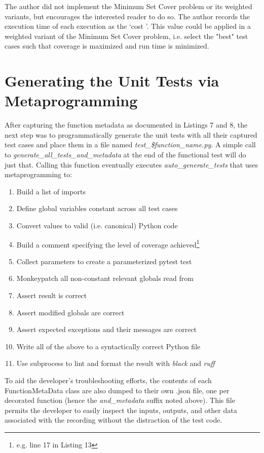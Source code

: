 The author did not implement 
the Minimum Set Cover problem or its weighted variants, but encourages 
the interested reader to do so.  The author records the execution time of each 
execution as the \lq cost \rq. This value could be applied in a weighted 
variant of the Minimum Set Cover problem, i.e. select the "best" test cases
such that coverage is maximized and run time is minimized.

\section{Generating the Unit Tests via Metaprogramming}\label{sec:generating-tests}

After capturing the function metadata as documented in Listings 7 and 8, 
the next step was to programmatically generate the unit tests with all their 
captured test cases and place them in a file named 
\textit{test\_\$function\_name.py}. 
A simple call to \textit{generate\_all\_tests\_and\_metadata} at the end of 
the functional test will do just that.
 Calling this function eventually executes 
\textit{auto\_generate\_tests} that uses metaprogramming to:
\begin{enumerate}
  \item Build a list of imports
  \item Define global variables constant across all test cases
  \item Convert values to valid (i.e. canonical) Python code
  \item Build a comment specifying the level of coverage achieved\footnote{e.g. line 17 in Listing 13}
  \item Collect parameters to create a parameterized pytest test
  \item Monkeypatch all non-constant relevant globals read from
  \item Assert result is correct
  \item Assert modified globals are correct
  \item Assert expected exceptions and their messages are correct
  \item Write all of the above to a syntactically correct Python file
  \item Use subprocess to lint and format the result with \textit{black} and \textit{ruff}
\end{enumerate}

To aid the developer's troubleshooting efforts, the contents of each FunctionMetaData
class are also dumped to their own .json file, one per decorated function (hence
the \textit{and\_metadata} suffix noted above).  This file permits the 
developer to easily inspect the inputs, outputs, and other data
associated with the recording without the distraction of the test code.

